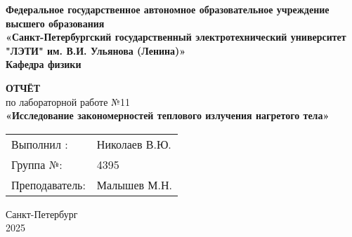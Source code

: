 \begin{center}
	\textbf{Федеральное государственное автономное образовательное учреждение высшего образования} \\
	\textbf{«Санкт-Петербургский государственный электротехнический университет "ЛЭТИ" им. В.И. Ульянова (Ленина)»} \\
	\vspace{0.5cm}
	\textbf{Кафедра физики}
\end{center}

\begin{center}
	\vspace{4cm}
	\textbf{\LARGE ОТЧЁТ}\\
	по лабораторной работе №11 \\
	\vspace{0.5cm}
	\textbf{«Исследование закономерностей теплового излучения нагретого тела»}
	\vspace{2cm}
\end{center}

\begin{tabular}{@{} l l @{}}
	Выполнил :     & Николаев В.Ю. \\[0.5em]
	Группа  №:     & 4395          \\[2em]
	Преподаватель: & Малышев М.Н.
\end{tabular}

\begin{center}
	\vfill
	Санкт-Петербург \\
	2025
\end{center}

